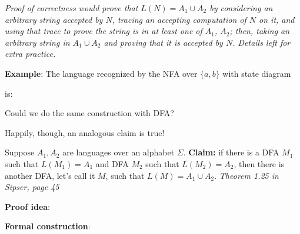 \documentclass[12pt, oneside]{article}
\begin{document}
\vfill
{\it Proof of correctness would prove that $L(N) = A_1 \cup A_2$ by considering
an arbitrary string accepted by $N$, tracing an accepting computation of $N$ on it, and using 
that trace to prove the string is in at least one of $A_1$, $A_2$; then, taking an arbitrary 
string in $A_1 \cup A_2$ and proving that it is accepted by $N$. Details left for extra practice.}


{\bf Example}: The language recognized by the NFA over $\{a,b\}$ with state diagram


is:


\newpage

Could we do the same construction with DFA?

\vspace{50pt}

Happily, though, an analogous claim is true!

Suppose $A_1, A_2$ are languages over an alphabet $\Sigma$.
{\bf Claim:} if there is a DFA $M_1$ such that $L(M_1) = A_1$ and 
DFA $M_2$ such that $L(M_2) = A_2$, then there is another DFA, let's call it $M$, such that 
$L(M) = A_1 \cup A_2$. {\it Theorem 1.25 in Sipser, page 45}
    
    {\bf Proof idea}:
    
    
    {\bf Formal construction}: 
    
    \vfill
\end{document}

